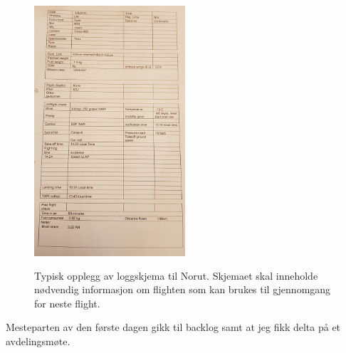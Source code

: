 \documentclass[12pt, a4paper]{report}
\begin{document}
\begin{figure}[ht]
	\centering
	\includegraphics[height= 10cm, width=0.5\textwidth]{bilder/flightlogNorut.png}
		\caption{Typisk opplegg av loggskjema til Norut. Skjemaet skal inneholde nødvendig informasjon om flighten som kan brukes til gjennomgang for neste flight. }
\end{figure}
\newpage
Mesteparten av den første dagen gikk til backlog samt at jeg fikk delta på et avdelingsmøte.\\
\end{document}
